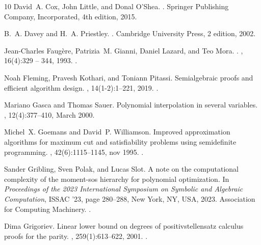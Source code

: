 \documentclass[11pt]{article}
\newcommand{\1}{\textbf{1}}
\begin{document}
\begin{thebibliography}{10}
David~A. Cox, John Little, and Donal O'Shea.
.
\newblock Springer Publishing Company, Incorporated, 4th edition, 2015.

B.~A. Davey and H.~A. Priestley.
.
\newblock Cambridge University Press, 2 edition, 2002.

Jean-Charles Faug{\`e}re, Patrizia~M. Gianni, Daniel Lazard, and Teo Mora.
.
, 16(4):329 -- 344, 1993.
\newblock \href {https://doi.org/10.1006/jsco.1993.1051} {}.

Noah Fleming, Pravesh Kothari, and Toniann Pitassi.
\newblock Semialgebraic proofs and efficient algorithm design.
, 14(1-2):1--221, 2019.
\newblock \href {https://doi.org/10.1561/0400000086} {}.

Mariano Gasca and Thomas Sauer.
\newblock Polynomial interpolation in several variables.
, 12(4):377--410, March 2000.

Michel~X. Goemans and David~P. Williamson.
\newblock Improved approximation algorithms for maximum cut and satisfiability problems using semidefinite programming.
, 42(6):1115–1145, nov 1995.
\newblock \href {https://doi.org/10.1145/227683.227684} {}.

Sander Gribling, Sven Polak, and Lucas Slot.
\newblock A note on the computational complexity of the moment-sos hierarchy for polynomial optimization.
\newblock In {\em Proceedings of the 2023 International Symposium on Symbolic and Algebraic Computation}, ISSAC '23, page 280–288, New York, NY, USA, 2023. Association for Computing Machinery.
\newblock \href {https://doi.org/10.1145/3597066.3597075} {}.

Dima Grigoriev.
\newblock Linear lower bound on degrees of positivstellensatz calculus proofs for the parity.
, 259(1):613--622, 2001.
\newblock \href {https://doi.org/10.1016/S0304-3975(00)00157-2} {}.


\end{thebibliography}
\end{document}
